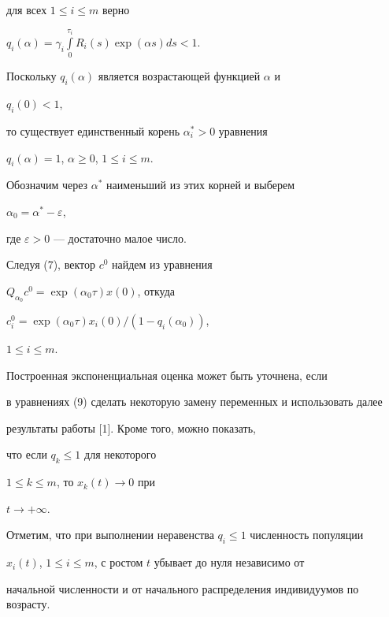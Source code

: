 для всех $1 \le i \le m$ верно


$q_i(\alpha)=


\gamma_i\int\limits_0^{\tau_i}R_i(s)\exp(\alpha s)ds<1$.


Поскольку $q_i(\alpha)$ является возрастающей функцией $\alpha$ и


$q_i(0) < 1$,


то существует единственный корень $\alpha_i^* > 0$ уравнения


$q_i(\alpha) = 1$, $\alpha \ge 0$, $1 \le i \le m$.


Обозначим через $\alpha^*$ наименьший из этих корней и выберем


$\alpha_0=\alpha^*-\varepsilon$,


где $\varepsilon > 0$ --- достаточно малое число.


Следуя (7), вектор $c^0$ найдем из уравнения


$Q_{\alpha_0}c^0=\exp(\alpha_0 \tau)x(0)$, откуда


$c^0_i=\exp(\alpha_0 \tau) x_i(0)/(1-q_i(\alpha_0))$,


$1 \le i \le m$.


Построенная экспоненциальная оценка может быть уточнена, если


в уравнениях (9) сделать некоторую замену переменных и использовать далее


результаты работы [1]. Кроме того, можно показать,


что если $q_k \le 1$ для некоторого


$1 \le k \le m$, то $x_k(t) \to 0$ при


$t \to + \infty$.


Отметим, что при выполнении неравенства $q_i \le 1$ численность популяции


$x_i(t)$, $1 \le i \le m$, с ростом $t$ убывает до нуля независимо от


начальной численности и от начального распределения индивидуумов по возрасту.








